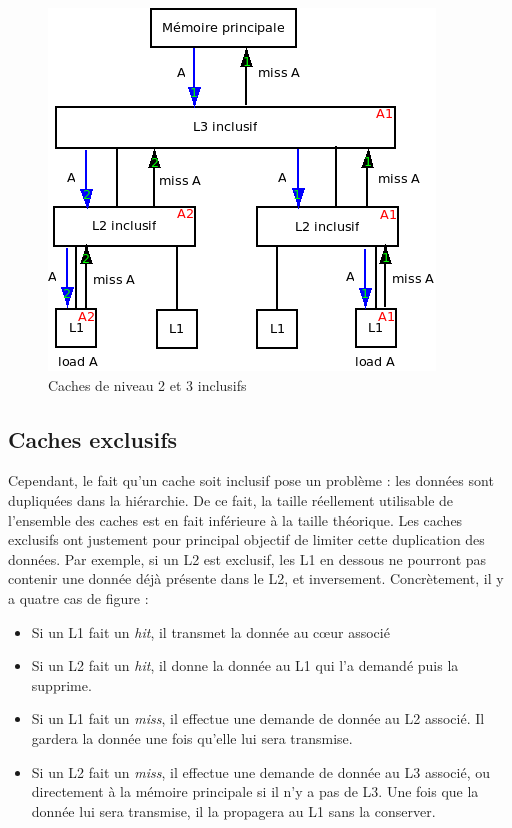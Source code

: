 \begin{figure}[!h]
\begin{center}
   \includegraphics[scale=0.7]{images/inclusifs.png}
   \caption{\label{img:inclusifs} Caches de niveau 2 et 3 inclusifs}
\end{center}
\end{figure}


\subsection{Caches exclusifs}
Cependant, le fait qu'un cache soit inclusif pose un problème : les données sont dupliquées dans la hiérarchie. De ce fait, la taille réellement utilisable de l'ensemble des caches est en fait inférieure à la taille théorique. Les caches exclusifs ont justement pour principal objectif de limiter cette duplication des données. Par exemple, si un L2 est exclusif, les L1 en dessous ne pourront pas contenir une donnée déjà présente dans le L2, et inversement. Concrètement, il y a quatre cas de figure : \\

\begin{itemize}
\item Si un L1 fait un \textit{hit}, il transmet la donnée au c{\oe}ur associé
\item Si un L2 fait un \textit{hit}, il donne la donnée au L1 qui l'a demandé puis la supprime.
\item Si un L1 fait un \textit{miss}, il effectue une demande de donnée au L2 associé. Il gardera la donnée une fois qu'elle lui sera transmise.
\item Si un L2 fait un \textit{miss}, il effectue une demande de donnée au L3 associé, ou directement à la mémoire principale si il n'y a pas de L3. Une fois que la donnée lui sera transmise, il la propagera au L1 sans la conserver. \\
\end{itemize}

